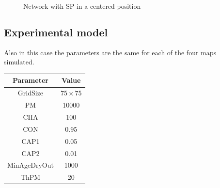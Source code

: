 \begin{figure}[H]
    \centering
    \caption{Network with SP in a centered position}
    \label{fig:foobar}
\end{figure}

\subsection{Experimental model}

Also in this case the parameters are the same for each of the four maps simulated.

\begin{center}
 \begin{tabular}{||c c||} 
 \hline
 Parameter & Value \\ [0.5ex] 
 \hline\hline
 GridSize & $75 \times 75$ \\ 
 \hline
 PM & 10000 \\ 
 \hline
 CHA & 100 \\ 
 \hline
 CON & 0.95 \\ 
 \hline
 CAP1 & 0.05 \\ 
 \hline
 CAP2 & 0.01 \\ 
 \hline
 MinAgeDryOut & 1000 \\
 \hline
 ThPM & 20 \\ [1ex] 
 \hline
 \end{tabular}
\end{center}

